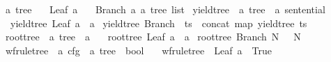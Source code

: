 \begin{isabellebody}
%
\endisadelimdocument
%
\isatagdocument
%
\isamarkuptrue%
%
\endisatagdocument
{\isafolddocument}%
%
\isadelimdocument
%
\endisadelimdocument
{}\isamarkupfalse%
\ {\isacharprime}{\kern0pt}a\ tree\ {\isacharequal}{\kern0pt}\isanewline
\ \ Leaf\ {\isacharprime}{\kern0pt}a\isanewline
\ \ {\isacharbar}{\kern0pt}\ Branch\ {\isacharprime}{\kern0pt}a\ {\isachardoublequoteopen}{\isacharprime}{\kern0pt}a\ tree\ list{\isachardoublequoteclose}\isanewline
\isanewline
{}\isamarkupfalse%
\ yield{\isacharunderscore}{\kern0pt}tree\ {\isacharcolon}{\kern0pt}{\isacharcolon}{\kern0pt}\ {\isachardoublequoteopen}{\isacharprime}{\kern0pt}a\ tree\ {\isasymRightarrow}\ {\isacharprime}{\kern0pt}a\ sentential{\isachardoublequoteclose}\ \isanewline
\ \ {\isachardoublequoteopen}yield{\isacharunderscore}{\kern0pt}tree\ {\isacharparenleft}{\kern0pt}Leaf\ a{\isacharparenright}{\kern0pt}\ {\isacharequal}{\kern0pt}\ {\isacharbrackleft}{\kern0pt}a{\isacharbrackright}{\kern0pt}{\isachardoublequoteclose}\isanewline
{\isacharbar}{\kern0pt}\ {\isachardoublequoteopen}yield{\isacharunderscore}{\kern0pt}tree\ {\isacharparenleft}{\kern0pt}Branch\ {\isacharunderscore}{\kern0pt}\ ts{\isacharparenright}{\kern0pt}\ {\isacharequal}{\kern0pt}\ concat\ {\isacharparenleft}{\kern0pt}map\ yield{\isacharunderscore}{\kern0pt}tree\ ts{\isacharparenright}{\kern0pt}{\isachardoublequoteclose}\isanewline
\isanewline
{}\isamarkupfalse%
\ root{\isacharunderscore}{\kern0pt}tree\ {\isacharcolon}{\kern0pt}{\isacharcolon}{\kern0pt}\ {\isachardoublequoteopen}{\isacharprime}{\kern0pt}a\ tree\ {\isasymRightarrow}\ {\isacharprime}{\kern0pt}a{\isachardoublequoteclose}\ \isanewline
\ \ {\isachardoublequoteopen}root{\isacharunderscore}{\kern0pt}tree\ {\isacharparenleft}{\kern0pt}Leaf\ a{\isacharparenright}{\kern0pt}\ {\isacharequal}{\kern0pt}\ a{\isachardoublequoteclose}\isanewline
{\isacharbar}{\kern0pt}\ {\isachardoublequoteopen}root{\isacharunderscore}{\kern0pt}tree\ {\isacharparenleft}{\kern0pt}Branch\ N\ {\isacharunderscore}{\kern0pt}{\isacharparenright}{\kern0pt}\ {\isacharequal}{\kern0pt}\ N{\isachardoublequoteclose}\isanewline
\isanewline
{}\isamarkupfalse%
\ wf{\isacharunderscore}{\kern0pt}rule{\isacharunderscore}{\kern0pt}tree\ {\isacharcolon}{\kern0pt}{\isacharcolon}{\kern0pt}\ {\isachardoublequoteopen}{\isacharprime}{\kern0pt}a\ cfg\ {\isasymRightarrow}\ {\isacharprime}{\kern0pt}a\ tree\ {\isasymRightarrow}\ bool{\isachardoublequoteclose}\ \isanewline
\ \ {\isachardoublequoteopen}wf{\isacharunderscore}{\kern0pt}rule{\isacharunderscore}{\kern0pt}tree\ {\isacharunderscore}{\kern0pt}\ {\isacharparenleft}{\kern0pt}Leaf\ a{\isacharparenright}{\kern0pt}\ {\isasymlongleftrightarrow}\ True{\isachardoublequoteclose}\isanewline

\end{isabellebody}
